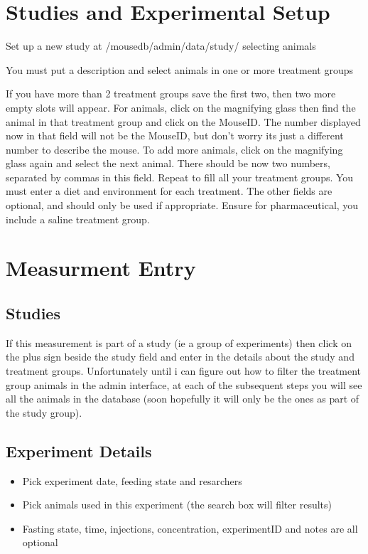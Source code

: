 \documentclass[letterpaper,10pt,english]{sphinxmanual}
\begin{document}
\chapter{Studies and Experimental Setup}

Set up a new study at /mousedb/admin/data/study/ selecting animals

You must put a description and select animals in one or more treatment groups

If you have more than 2 treatment groups save the first two, then two more empty slots will appear. For animals, click on the magnifying glass then find the animal in that treatment group and click on the MouseID. The number displayed now in that field will not be the MouseID, but don't worry its just a different number to describe the mouse. To add more animals, click on the magnifying glass again and select the next animal. There should be now two numbers, separated by commas in this field. Repeat to fill all your treatment groups. You must enter a diet and environment for each treatment. The other fields are optional, and should only be used if appropriate. Ensure for pharmaceutical, you include a saline treatment group.


\chapter{Measurment Entry}


\section{Studies}

If this measurement is part of a study (ie a group of experiments) then click on the plus sign beside the study field and enter in the details about the study and treatment groups.  Unfortunately until i can figure out how to filter the treatment group animals in the admin interface, at each of the subsequent steps you will see all the animals in the database (soon hopefully it will only be the ones as part of the study group).


\section{Experiment Details}
\begin{itemize}
\item {} 
Pick experiment date, feeding state and resarchers

\item {} 
Pick animals used in this experiment (the search box will filter results)

\item {} 
Fasting state, time, injections, concentration, experimentID and notes are all optional

\end{itemize}
\end{document}
